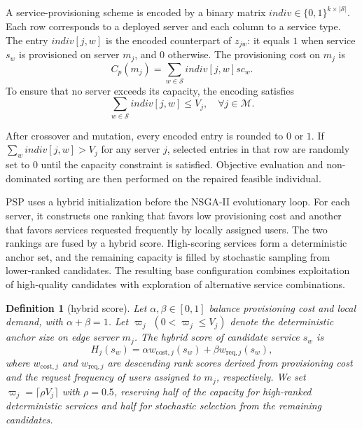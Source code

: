 \documentclass[10pt, conference, letterpaper]{IEEEtran}
\newtheorem{definition}{\textbf{Definition}}
\begin{document}
A service-provisioning scheme is encoded by a binary matrix $\textit{indiv}\in\{0,1\}^{k\times|\mathcal{S}|}$. Each row corresponds to a deployed server and each column to a service type. The entry $\textit{indiv}[j,w]$ is the encoded counterpart of $z_{jw}$: it equals $1$ when service $s_w$ is provisioned on server $m_j$, and $0$ otherwise. The provisioning cost on $m_j$ is
\begin{equation}
C_{p}(m_j)=\sum_{w\in\mathcal{S}}\textit{indiv}[j,w]sc_w.
\end{equation}
To ensure that no server exceeds its capacity, the encoding satisfies
\begin{equation}
\sum_{w \in \mathcal{S}} \textit{indiv}[j, w] \leq V_j, \quad \forall j \in \mathcal{M}.
\end{equation}


After crossover and mutation, every encoded entry is rounded to $0$ or $1$. If $\sum_w \textit{indiv}[j,w]>V_j$ for any server $j$, selected entries in that row are randomly set to $0$ until the capacity constraint is satisfied. Objective evaluation and non-dominated sorting are then performed on the repaired feasible individual.



PSP uses a hybrid initialization before the NSGA-II evolutionary loop. For each server, it constructs one ranking that favors low provisioning cost and another that favors services requested frequently by locally assigned users. The two rankings are fused by a hybrid score. High-scoring services form a deterministic anchor set, and the remaining capacity is filled by stochastic sampling from lower-ranked candidates. The resulting base configuration combines exploitation of high-quality candidates with exploration of alternative service combinations.


\begin{definition}[hybrid score]\label{def:init_pop}
Let $\alpha,\beta\in[0,1]$ balance provisioning cost and local demand, with $\alpha+\beta=1$. Let $\varpi_j$ $(0<\varpi_j\leq V_j)$ denote the deterministic anchor size on edge server $m_j$. The hybrid score of candidate service $s_w$ is
\begin{equation}
H_j(s_w)=\alpha w_{\mathrm{cost},j}(s_w)+\beta w_{\mathrm{req},j}(s_w),
\label{eq:hybrid_score}
\end{equation}
where $w_{\mathrm{cost},j}$ and $w_{\mathrm{req},j}$ are descending rank scores derived from provisioning cost and the request frequency of users assigned to $m_j$, respectively. We set $\varpi_j=\lceil\rho V_j\rceil$ with $\rho=0.5$, reserving half of the capacity for high-ranked deterministic services and half for stochastic selection from the remaining candidates.
\end{definition}
\end{document}
